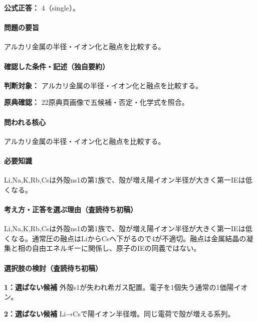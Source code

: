 \textbf{公式正答：} 4（single）。

\paragraph{問題の要旨} アルカリ金属の半径・イオン化と融点を比較する。

\paragraph{確認した条件・記述（独自要約）}\mbox{}\par

\noindent\textbf{判断対象：} アルカリ金属の半径・イオン化と融点を比較する。\par

\noindent\textbf{原典確認：} 22原典頁画像で五候補・否定・化学式を照合。\par

\paragraph{問われる核心} アルカリ金属の半径・イオン化と融点を比較する。

\paragraph{必要知識} Li,Na,K,Rb,Csは外殻ns1の第1族で、殻が増え陽イオン半径が大きく第一IEは低くなる。

\paragraph{考え方・正答を選ぶ理由（査読待ち初稿）} Li,Na,K,Rb,Csは外殻ns1の第1族で、殻が増え陽イオン半径が大きく第一IEは低くなる。通常圧の融点はLiからCsへ下がるので4が不適切。融点は金属結晶の凝集と相の自由エネルギーに関係し、原子のIEの同義ではない。

\paragraph{選択肢の検討（査読待ち初稿）}\mbox{}\par

\noindent\textbf{1：選ばない候補} 外殻s1が失われ希ガス配置。電子を1個失う通常の1価陽イオン。\par

\noindent\textbf{2：選ばない候補} Li→Csで陽イオン半径増。同じ電荷で殻が増える系列。\par

